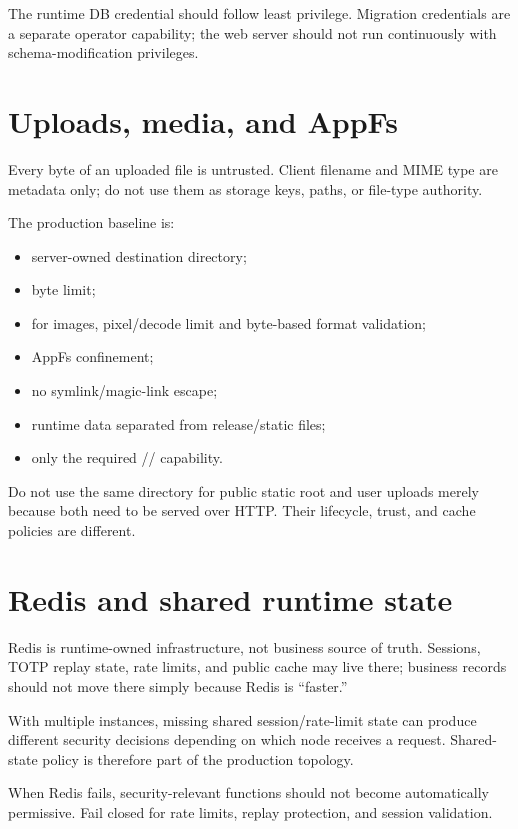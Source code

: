 The runtime DB credential should follow least privilege. Migration credentials are a separate operator capability; the web server should not run continuously with schema-modification privileges.

\section{Uploads, media, and AppFs}

Every byte of an uploaded file is untrusted. Client filename and MIME type are metadata only; do not use them as storage keys, paths, or file-type authority.

The production baseline is:

\begin{itemize}
  \item server-owned destination directory;
  \item byte limit;
  \item for images, pixel/decode limit and byte-based format validation;
  \item AppFs confinement;
  \item no symlink/magic-link escape;
  \item runtime data separated from release/static files;
  \item only the required // capability.
\end{itemize}

Do not use the same directory for public static root and user uploads merely because both need to be served over HTTP. Their lifecycle, trust, and cache policies are different.

\section{Redis and shared runtime state}

Redis is runtime-owned infrastructure, not business source of truth. Sessions, TOTP replay state, rate limits, and public cache may live there; business records should not move there simply because Redis is ``faster.''

With multiple instances, missing shared session/rate-limit state can produce different security decisions depending on which node receives a request. Shared-state policy is therefore part of the production topology.

When Redis fails, security-relevant functions should not become automatically permissive. Fail closed for rate limits, replay protection, and session validation.

